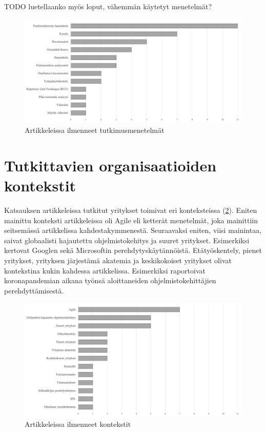 \documentclass[utf8]{gradu3}
\begin{document}
TODO luetellaanko myös loput, vähemmän käytetyt menetelmät?

\begin{figure}[h]
    \centering
    \includegraphics[width=\textwidth]{media/menetelmat.png}
    \caption{Artikkeleissa ilmenneet tutkimusmenetelmät}
    \label{kuvio:tutkimusmenetelmat}
\end{figure}


\section{Tutkittavien organisaatioiden kontekstit}

Katsauksen artikkeleissa tutkitut yritykset toimivat eri konteksteissa (\ref{kuvio:kontekstit}). Eniten mainittu konteksti artikkeleissa oli Agile eli ketterät menetelmät, joka mainittiin seitsemässä artikkelissa kahdestakymmenestä. Seuraavaksi eniten, viisi mainintaa, saivat globaalisti hajautettu ohjelmistokehitys ja suuret yritykset. Esimerkiksi \textcite{johnson-senges-2010} kertovat Googlen sekä \textcite{rodeghero-ym-2021} \textcite{ju-ym-2021} Microsoftin perehdytyskäytännöistä. Etätyöskentely, pienet yritykset, yrityksen järjestämä akatemia ja keskikokoiset yritykset olivat kontekstina kukin kahdessa artikkelissa. Esimerkiksi \textcite{rodeghero-ym-2021} raportoivat koronapandemian aikana työnsä aloittaneiden ohjelmistokehittäjien perehdyttämisestä.

\begin{figure}[h]
    \centering
    \includegraphics[width=\textwidth]{media/kontekstit.png}
    \caption{Artikkeleissa ilmenneet kontekstit}
    \label{kuvio:kontekstit}
\end{figure}
\end{document}
